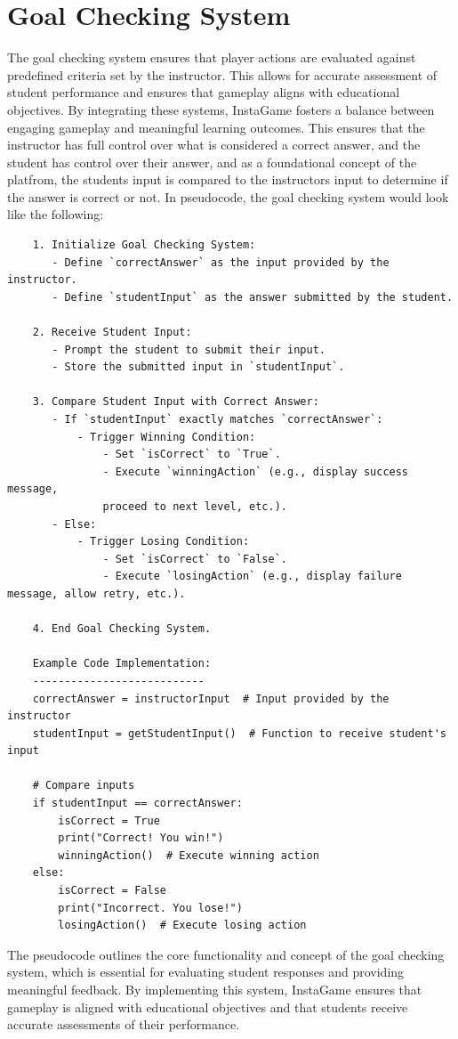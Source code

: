 \section{Goal Checking System}
The goal checking system ensures that player actions are evaluated against predefined criteria set by the instructor. This allows for accurate assessment of student performance and ensures that gameplay aligns with educational objectives. By integrating these systems, InstaGame fosters a balance between engaging gameplay and meaningful learning outcomes. This ensures that the instructor has full control over what is considered a correct answer, and the student has control over their answer, and as a foundational concept of the platfrom, the students input is compared to the instructors input to determine if the answer is correct or not. In pseudocode, the goal checking system would look like the following: 
\begin{verbatim}
	1. Initialize Goal Checking System:
	   - Define `correctAnswer` as the input provided by the instructor.
	   - Define `studentInput` as the answer submitted by the student.
	
	2. Receive Student Input:
	   - Prompt the student to submit their input.
	   - Store the submitted input in `studentInput`.
	
	3. Compare Student Input with Correct Answer:
	   - If `studentInput` exactly matches `correctAnswer`:
		   - Trigger Winning Condition:
			   - Set `isCorrect` to `True`.
			   - Execute `winningAction` (e.g., display success message, 
			   proceed to next level, etc.).
	   - Else:
		   - Trigger Losing Condition:
			   - Set `isCorrect` to `False`.
			   - Execute `losingAction` (e.g., display failure message, allow retry, etc.).
	
	4. End Goal Checking System.
	
	Example Code Implementation:
	---------------------------
	correctAnswer = instructorInput  # Input provided by the instructor
	studentInput = getStudentInput()  # Function to receive student's input
	
	# Compare inputs
	if studentInput == correctAnswer:
		isCorrect = True
		print("Correct! You win!")
		winningAction()  # Execute winning action
	else:
		isCorrect = False
		print("Incorrect. You lose!")
		losingAction()  # Execute losing action
	\end{verbatim}

The pseudocode outlines the core functionality and concept of the goal checking system, which is essential for evaluating student responses and providing meaningful feedback. By implementing this system, InstaGame ensures that gameplay is aligned with educational objectives and that students receive accurate assessments of their performance.